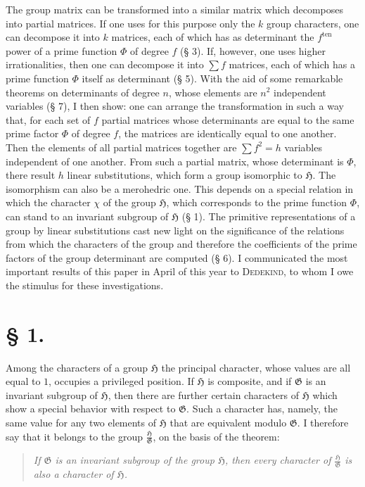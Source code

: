 \documentclass[11pt]{article}
\newcommand{\Hgrp}{\mathfrak{H}}
\newcommand{\Ggrp}{\mathfrak{G}}
\newcommand{\ten}{\mathrm{ten}}
\begin{document}
The group matrix can be transformed into a similar matrix which decomposes into partial matrices. If one uses for this purpose only the $k$ group characters, one can decompose it into $k$ matrices, each of which has as determinant the $f^{\ten}$ power of a prime function $\Phi$ of degree $f$ (§ 3). If, however, one uses higher irrationalities, then one can decompose it into $\sum f$ matrices, each of which has a prime function $\Phi$ itself as determinant (§ 5). With the aid of some remarkable theorems on determinants of degree $n$, whose elements are $n^2$ independent variables (§ 7), I then show: one can arrange the transformation in such a way that, for each set of $f$ partial matrices whose determinants are equal to the same prime factor $\Phi$ of degree $f$, the matrices are identically equal to one another. Then the elements of all partial matrices together are $\sum f^2=h$ variables independent of one another. From such a partial matrix, whose determinant is $\Phi$, there result $h$ linear substitutions, which form a group isomorphic to $\Hgrp$. The isomorphism can also be a merohedric one. This depends on a special relation in which the character $\chi$ of the group $\Hgrp$, which corresponds to the prime function $\Phi$, can stand to an invariant subgroup of $\Hgrp$ (§ 1). The primitive representations of a group by linear substitutions cast new light on the significance of the relations from which the characters of the group and therefore the coefficients of the prime factors of the group determinant are computed (§ 6). I communicated the most important results of this paper in April of this year to \textsc{Dedekind}, to whom I owe the stimulus for these investigations.

\section*{§ 1.}

Among the characters of a group $\Hgrp$ the principal character, whose values are all equal to $1$, occupies a privileged position. If $\Hgrp$ is composite, and if $\Ggrp$ is an invariant subgroup of $\Hgrp$, then there are further certain characters of $\Hgrp$ which show a special behavior with respect to $\Ggrp$. Such a character has, namely, the same value for any two elements of $\Hgrp$ that are equivalent modulo $\Ggrp$. I therefore say that it belongs to the group $\frac{\Hgrp}{\Ggrp}$, on the basis of the theorem:

\begin{quote}\itshape
If $\Ggrp$ is an invariant subgroup of the group $\Hgrp$, then every character of $\frac{\Hgrp}{\Ggrp}$ is also a character of $\Hgrp$.
\end{quote}
\end{document}
